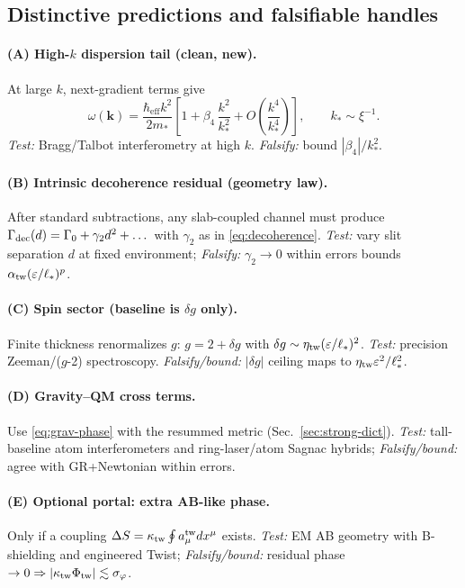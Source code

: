 \subsection{Distinctive predictions and falsifiable handles}
\label{sec:QM_tests}

\paragraph{(A) High-$k$ dispersion tail (clean, new).}
At large \(k\), next-gradient terms give
\begin{equation}
\omega(\mathbf k) = \frac{\hbar_{\mathrm{eff}} k^2}{2m_*}\left[1 + \beta_4\,\frac{k^2}{k_*^2} + O\!\left(\frac{k^4}{k_*^4}\right)\right], \qquad k_* \sim \xi^{-1}.
\label{eq:dispersion}
\end{equation}
\emph{Test:} Bragg/Talbot interferometry at high \(k\). \emph{Falsify:} bound \(|\beta_4|/k_*^2\).

\paragraph{(B) Intrinsic decoherence residual (geometry law).}
After standard subtractions, any slab-coupled channel must produce \(\Gamma_{\rm dec}(d)=\Gamma_0+\gamma_2 d^2+\dots\) with \(\gamma_2\) as in \eqref{eq:decoherence}. \emph{Test:} vary slit separation \(d\) at fixed environment; \emph{Falsify:} \(\gamma_2\to 0\) within errors bounds \(\alpha_{\rm tw}(\varepsilon/\ell_*)^p\).

\paragraph{(C) Spin sector (baseline is $\delta g$ only).}
Finite thickness renormalizes \(g\): \(g=2+\delta g\) with \(\delta g \sim \eta_{\rm tw}(\varepsilon/\ell_*)^2\). \emph{Test:} precision Zeeman/($g$-2) spectroscopy. \emph{Falsify/bound:} \(|\delta g|\) ceiling maps to \(\eta_{\rm tw}\varepsilon^2/\ell_*^2\).

\paragraph{(D) Gravity--QM cross terms.}
Use \eqref{eq:grav-phase} with the resummed metric (Sec.~\ref{sec:strong-dict}). \emph{Test:} tall-baseline atom interferometers and ring-laser/atom Sagnac hybrids; \emph{Falsify/bound:} agree with GR+Newtonian within errors.

\paragraph{(E) Optional portal: extra AB-like phase.}
Only if a coupling \(\Delta S=\kappa_{\rm tw}\oint a^{\rm tw}_\mu dx^\mu\) exists. \emph{Test:} EM AB geometry with B-shielding and engineered Twist; \emph{Falsify/bound:} residual phase \(\to 0\Rightarrow |\kappa_{\rm tw}\Phi_{\rm tw}| \lesssim \sigma_\varphi\).

